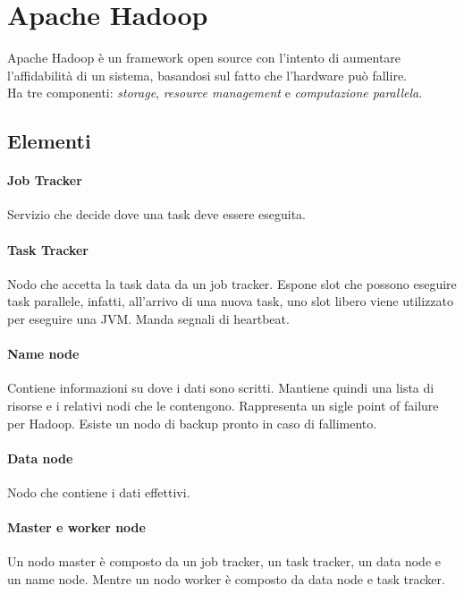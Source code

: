 \section{Apache Hadoop}
Apache Hadoop è un framework open source con l'intento di aumentare l'affidabilità di un sistema, basandosi sul fatto che l'hardware può fallire.
\\Ha tre componenti: \emph{storage}, \emph{resource management} e \emph{computazione parallela}.

\subsection{Elementi}

\paragraph{Job Tracker}
Servizio che decide dove una task deve essere eseguita.

\paragraph{Task Tracker}
Nodo che accetta la task data da un job tracker. Espone slot che possono eseguire
task parallele, infatti, all'arrivo di una nuova task, uno slot libero viene utilizzato per eseguire una JVM. Manda segnali di heartbeat.

\paragraph{Name node}
Contiene informazioni su dove i dati sono scritti. Mantiene quindi una lista 
di risorse e i relativi nodi che le contengono. Rappresenta un sigle point of failure
per Hadoop. Esiste un nodo di backup pronto in caso di fallimento.

\paragraph{Data node}
Nodo che contiene i dati effettivi.

\paragraph{Master e worker node}
Un nodo master è composto da un job tracker, un task tracker, un data node e un name node. Mentre un nodo worker è composto da data node e task tracker.


